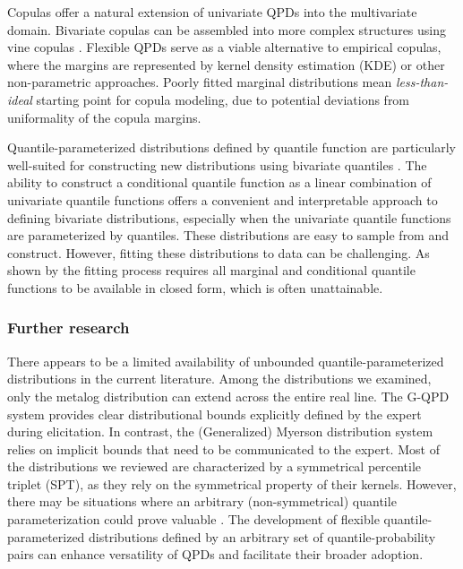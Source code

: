 \documentclass[
  fleqn,
  deca,
  blindrev
]{informs4}
\begin{document}
Copulas offer a natural extension of univariate QPDs into the
multivariate domain. Bivariate copulas can be assembled into more
complex structures using vine copulas
\citep{czado2019AnalyzingDependentData, kurowicka2011DependenceModelingVine, wilson2018SpecificationInformativePrior}.
Flexible QPDs serve as a viable alternative to empirical copulas, where
the margins are represented by kernel density estimation (KDE) or other
non-parametric approaches. Poorly fitted marginal distributions mean
\emph{less-than-ideal} starting point for copula modeling, due to
potential deviations from uniformality of the copula margins.

Quantile-parameterized distributions defined by quantile function are
particularly well-suited for constructing new distributions using
bivariate quantiles
\citep{nair2023PropertiesBivariateDistributions, vineshkumar2019BivariateQuantileFunctions}.
The ability to construct a conditional quantile function as a linear
combination of univariate quantile functions offers a convenient and
interpretable approach to defining bivariate distributions, especially
when the univariate quantile functions are parameterized by quantiles.
These distributions are easy to sample from and construct. However,
fitting these distributions to data can be challenging. As shown by
\citet{castillo1997FittingContinuousBivariate} the fitting process
requires all marginal and conditional quantile functions to be available
in closed form, which is often unattainable.

\subsubsection*{Further research}\label{further-research}

There appears to be a limited availability of unbounded
quantile-parameterized distributions in the current literature. Among
the distributions we examined, only the metalog distribution can extend
across the entire real line. The G-QPD system provides clear
distributional bounds explicitly defined by the expert during
elicitation. In contrast, the (Generalized) Myerson distribution system
relies on implicit bounds that need to be communicated to the expert.
Most of the distributions we reviewed are characterized by a symmetrical
percentile triplet (SPT), as they rely on the symmetrical property of
their kernels. However, there may be situations where an arbitrary
(non-symmetrical) quantile parameterization could prove valuable
\citep[as shown
by][]{perepolkin2024HybridElicitationQuantileparametrized}. The
development of flexible quantile-parameterized distributions defined by
an arbitrary set of quantile-probability pairs can enhance versatility
of QPDs and facilitate their broader adoption.
\end{document}
